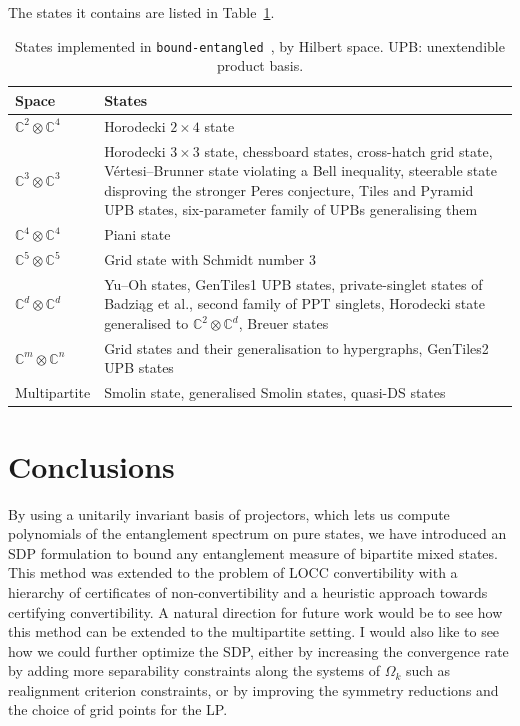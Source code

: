 \documentclass[11pt,a4paper]{report}
\newcommand{\C}{\mathds{C}}
\begin{document}
The states it contains are listed in Table~\ref{tab:boundentangled}.
\begin{table}[h]
\centering\small\renewcommand{\arraystretch}{1.15}
\begin{tabular}{@{}lp{12.3cm}@{}}
\hline
Space & States \\
\hline
$\C^2\otimes\C^4$ & Horodecki $2\times4$ state \\
$\C^3\otimes\C^3$ & Horodecki $3\times3$ state, chessboard states, cross-hatch grid state, Vértesi--Brunner state violating a Bell inequality, steerable state disproving the stronger Peres conjecture, Tiles and Pyramid UPB states, six-parameter family of UPBs generalising them \\
$\C^4\otimes\C^4$ & Piani state \\
$\C^5\otimes\C^5$ & Grid state with Schmidt number 3\\
$\C^d\otimes\C^d$ & Yu--Oh states, GenTiles1 UPB states, private-singlet states of Badzi\k{a}g et al., second family of PPT singlets, Horodecki state generalised to $\C^2\otimes\C^d$, Breuer states \\
$\C^m\otimes\C^n$ & Grid states and their generalisation to hypergraphs, GenTiles2 UPB states \\
Multipartite & Smolin state, generalised Smolin states, quasi-DS states \\
\hline
\end{tabular}
\caption{States implemented in \texttt{bound-entangled}~\cite{boundEntangled}, by Hilbert space. UPB: unextendible product basis.}
\label{tab:boundentangled}
\end{table}

\chapter{Conclusions}\label{ch:conclusions}

By using a unitarily invariant basis of projectors, which lets us compute polynomials of the entanglement spectrum on pure states, we have introduced an SDP formulation to bound any entanglement measure of bipartite mixed states. This method was extended to the problem of LOCC convertibility with a hierarchy of certificates of non-convertibility and a heuristic approach towards certifying convertibility.
A natural direction for future work would be to see how this method can be extended to the multipartite setting. I would also like to see how we could further optimize the SDP, either by increasing the convergence rate by adding more separability constraints along the systems of $\Omega_k$ such as realignment criterion constraints, or by improving the symmetry reductions and the choice of grid points for the LP.
\end{document}
